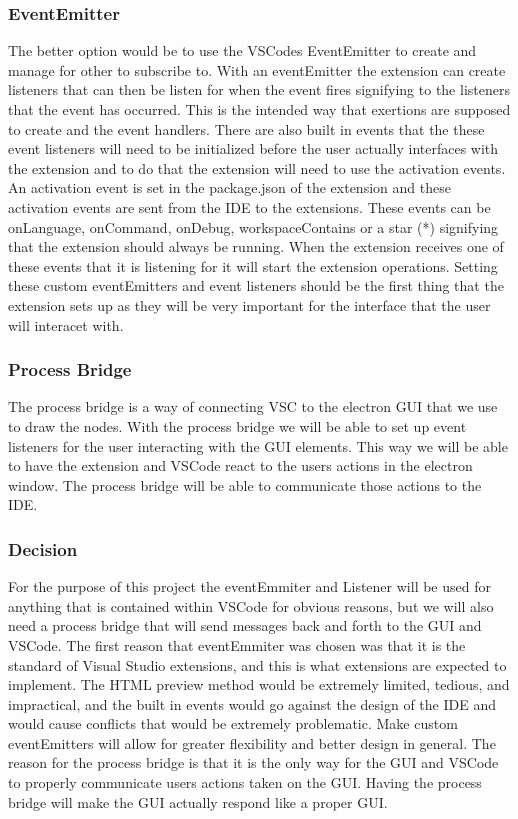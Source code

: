 \documentclass[letterpaper,10pt,titlepage,draftclsnofoot,onecolumn,onesided] {IEEEtran}
\begin{document}
\subsubsection{EventEmitter}
The better option would be to use the VSCodes EventEmitter to create and manage for other to subscribe to. 
With an eventEmitter the extension can create listeners that can then be listen for when the event fires signifying to the listeners that the event has occurred. 
This is the intended way that exertions are supposed to create and the event handlers. 
There are also built in events that the these event listeners will need to be initialized before the user actually interfaces with the extension and to do that the extension will need to use the activation events. 
An activation event is set in the package.json of the extension and these activation events are sent from the IDE to the extensions.
These events can be onLanguage, onCommand, onDebug, workspaceContains or a star (*) signifying that the extension should always be running. 
When the extension receives one of these events that it is listening for it will start the extension operations. 
Setting these custom eventEmitters and event listeners should be the first thing that the extension sets up as they will be very important for the interface that the user will interacet with. \cite{VSCodeDocumentation}

\subsubsection{Process Bridge}
The process bridge is a way of connecting VSC to the electron GUI that we use to draw the nodes. 
With the process bridge we will be able to set up event listeners for the user interacting with the GUI elements.
This way we will be able to have the extension and VSCode react to the users actions in the electron window. 
The process bridge will be able to communicate those actions to the IDE. 

\subsubsection{Decision}
For the purpose of this project the eventEmmiter and Listener will be used for anything that is contained within VSCode for obvious reasons, but we will also need a process bridge that will send messages back and forth to the GUI and VSCode. 
The first reason that eventEmmiter was chosen was that it is the standard of Visual Studio extensions, and this is what extensions are expected to implement. 
The HTML preview method would be extremely limited, tedious, and impractical, and the built in events would go against the design of the IDE and would cause conflicts that would be extremely problematic.
Make custom eventEmitters will allow for greater flexibility and better design in general. 
The reason for the process bridge is that it is the only way for the GUI and VSCode to properly communicate users actions taken on the GUI.
Having the process bridge will make the GUI actually respond like a proper GUI.
 
\end{document}
